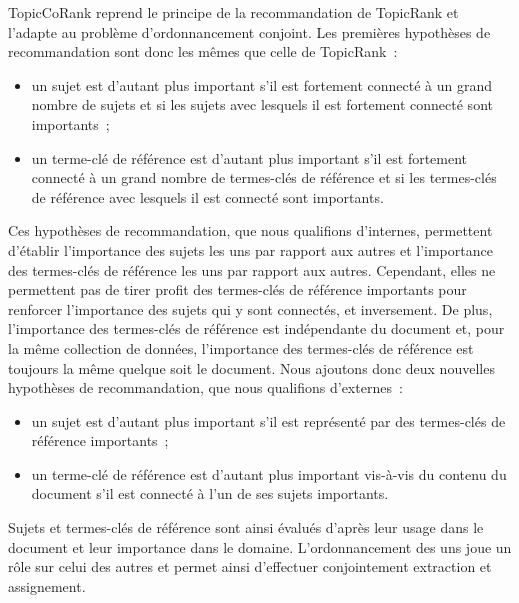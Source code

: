         TopicCoRank reprend le principe de la recommandation de TopicRank et
        l'adapte au problème d'ordonnancement conjoint. Les premières hypothèses
        de recommandation sont donc les mêmes que celle de TopicRank~:
        \begin{itemize}
          \item{un sujet est d'autant plus important s'il est fortement connecté
                à un grand nombre de sujets et si les sujets avec lesquels il
                est fortement connecté sont importants~;}
          \item{un terme-clé de référence est d'autant plus important s'il est
                fortement connecté à un grand nombre de termes-clés de référence
                et si les termes-clés de référence avec lesquels il est connecté
                sont importants.}
        \end{itemize}
        Ces hypothèses de recommandation, que nous qualifions d'internes,
        permettent d'établir l'importance des sujets les uns par rapport aux
        autres et l'importance des termes-clés de référence les uns par rapport
        aux autres. Cependant, elles ne permettent pas de tirer profit des
        termes-clés de référence importants pour renforcer l'importance des
        sujets qui y sont connectés, et inversement. De plus,
        l'importance des termes-clés de référence est indépendante du document
        et, pour la même collection de données, l'importance des termes-clés de
        référence est toujours la même quelque soit le document. Nous ajoutons
        donc deux nouvelles hypothèses de recommandation, que nous qualifions
        d'externes~:
        \begin{itemize}
          \item{un sujet est d'autant plus important s'il est représenté par des
                termes-clés de référence importants~;}
          \item{un terme-clé de référence est d'autant plus important vis-à-vis
                du contenu du document s'il est connecté à l'un de ses sujets
                importants.}
        \end{itemize}
        Sujets et termes-clés de référence sont ainsi évalués d'après leur usage
        dans le document et leur importance dans le domaine. L'ordonnancement
        des uns joue un rôle sur celui des autres et permet ainsi d'effectuer
        conjointement extraction et assignement.

